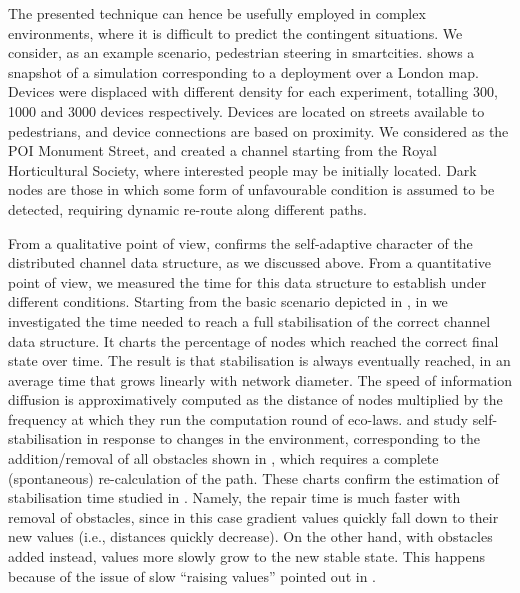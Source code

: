 \documentclass[12pt,a4paper,twoside,openright]{book}
\begin{document}
The presented technique can hence be usefully employed in complex environments, where it is difficult to predict the contingent situations.
%
We consider, as an example scenario, pedestrian steering in smartcities.
%
 shows a snapshot of a simulation corresponding to a deployment over a London map.
%
Devices were displaced with different density for each experiment, totalling 300, 1000 and 3000 devices respectively.
%
Devices are located on streets available to pedestrians, and device connections are based on proximity.
%
We considered as the POI Monument Street, and created a channel starting from the Royal Horticultural Society, where interested people may be initially located.
%
Dark nodes are those in which some form of unfavourable condition is assumed to be detected, requiring dynamic re-route along different paths.

From a qualitative point of view,  confirms the self-adaptive character of the distributed channel data structure, as we discussed above.
%
From a quantitative point of view, we measured the time for this data structure to establish under different conditions.
%
Starting from the basic scenario depicted in , in  we investigated the time needed to reach a full stabilisation of the correct channel data structure. It charts the percentage of nodes which reached the correct final state over time.
%
The result is that stabilisation is always eventually reached, in an average time that grows linearly with network diameter.
%
The speed of information diffusion is approximatively computed as the distance of nodes multiplied by the frequency at which they run the computation round of eco-laws.
%
 and  study self-stabilisation in response to changes in the environment, corresponding to the addition/removal of all obstacles shown in , which requires a complete (spontaneous) re-calculation of the path.
%
These charts confirm the estimation of stabilisation time studied in \cite{crf}.
%
Namely, the repair time is much faster with removal of obstacles, since in this case gradient values quickly fall down to their new values (i.e., distances quickly decrease).
%
On the other hand, with obstacles added instead, values more slowly grow to the new stable state.
%
This happens because of the issue of slow ``raising values'' pointed out in \cite{crf}.
\end{document}
